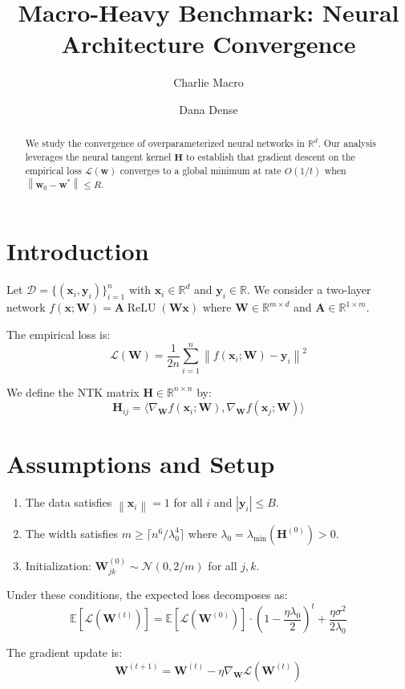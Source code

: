 \documentclass{article}
\title{Macro-Heavy Benchmark: Neural Architecture Convergence}
\author{Charlie Macro \and Dana Dense}
\newcommand{\vx}{\mathbf{x}}
\newcommand{\vy}{\mathbf{y}}
\newcommand{\vw}{\mathbf{w}}
\newcommand{\mA}{\mathbf{A}}
\newcommand{\mW}{\mathbf{W}}
\newcommand{\mH}{\mathbf{H}}
\newcommand{\real}{\mathbb{R}}
\newcommand{\expect}{\mathbb{E}}
\newcommand{\loss}{\mathcal{L}}
\newcommand{\dataset}{\mathcal{D}}
\newcommand{\norm}[1]{\left\|#1\right\|}
\newcommand{\inner}[2]{\langle #1, #2 \rangle}
\newcommand{\abs}[1]{\left|#1\right|}
\newcommand{\ceil}[1]{\lceil #1 \rceil}
\newcommand{\relu}{\operatorname{ReLU}}
\begin{document}
\maketitle

\begin{abstract}
We study the convergence of overparameterized neural networks in $\real^d$.
Our analysis leverages the neural tangent kernel $\mH$ to establish
that gradient descent on the empirical loss $\loss(\vw)$ converges to a
global minimum at rate $O(1/t)$ when $\norm{\vw_0 - \vw^*} \leq R$.
\end{abstract}

\section{Introduction}

Let $\dataset = \{(\vx_i, \vy_i)\}_{i=1}^n$ with $\vx_i \in \real^d$
and $\vy_i \in \real$.  We consider a two-layer network
$f(\vx; \mW) = \mA \relu(\mW \vx)$ where $\mW \in \real^{m \times d}$
and $\mA \in \real^{1 \times m}$.

The empirical loss is:
\[
\loss(\mW) = \frac{1}{2n} \sum_{i=1}^n \norm{f(\vx_i; \mW) - \vy_i}^2
\]

We define the NTK matrix $\mH \in \real^{n \times n}$ by:
\[
\mH_{ij} = \inner{\nabla_{\mW} f(\vx_i; \mW)}{\nabla_{\mW} f(\vx_j; \mW)}
\]

\section{Assumptions and Setup}

\begin{enumerate}
\item The data satisfies $\norm{\vx_i} = 1$ for all $i$ and $\abs{\vy_i} \leq B$.
\item The width satisfies $m \geq \ceil{n^6 / \lambda_0^4}$ where $\lambda_0 = \lambda_{\min}(\mH^{(0)}) > 0$.
\item Initialization: $\mW^{(0)}_{jk} \sim \mathcal{N}(0, 2/m)$ for all $j, k$.
\end{enumerate}

Under these conditions, the expected loss decomposes as:
\[
\expect[\loss(\mW^{(t)})] = \expect[\loss(\mW^{(0)})] \cdot \left(1 - \frac{\eta \lambda_0}{2}\right)^t + \frac{\eta \sigma^2}{2 \lambda_0}
\]

The gradient update is:
\[
\mW^{(t+1)} = \mW^{(t)} - \eta \nabla_{\mW} \loss(\mW^{(t)})
\]
\end{document}
